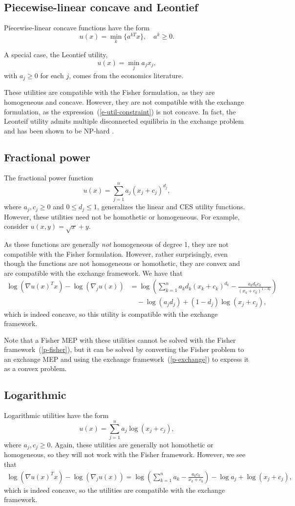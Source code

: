 \documentclass[12pt]{article}
\begin{document}
\subsection{Piecewise-linear concave and Leontief}
Piecewise-linear concave functions have the form
\[
u(x) = \min_k\lbrace a^{kT}x \rbrace,\quad a^k \geq 0.
\]

A special case, the Leontief utility,
\[
u(x) = \min_j a_j x_j,
\]
with $a_j \geq 0$ for each $j$,  comes from the economics literature. 

These utilities are compatible with the Fisher formulation, as they are
homogeneous and concave. However, they are not compatible with the exchange
formulation, as the expression~(\ref{e-util-constraint}) is not concave. In
fact, the Leonteif utility admits multiple disconnected equilibria in the
exchange problem and has been shown to be NP-hard \cite{codenotti2006leontief}.

\subsection{Fractional power}
The fractional power function
\[
u(x) = \sum_{j=1}^n a_j (x_j+ c_j)^{d_j},
\]
where $a_j, c_j \geq 0$ and $0 \leq d_j \leq 1$,
generalizes the linear and CES utility functions.
However, these utilities need not be homothetic or homogeneous.
For example, consider $u(x,y) = \sqrt{x} + y$.

As these functions are generally \emph{not} homogeneous of degree 1,
they are not compatible with the Fisher formulation.
However, rather surprisingly, even though the
functions are not homogeneous or homothetic, they are
convex and are compatible with the exchange framework.
We have that
\begin{align*}
\log(\nabla u(x)^T x) - \log(\nabla_j u(x))
&= \log\left(\sum_{k=1}^n a_k d_k (x_k+c_k)^{d_k} - \frac{a_k d_k c_k}{(x_k + c_k)^{1-d_k}} \right)\\
&\quad- \log(a_j d_j) + (1-d_j)\log (x_j + c_j),
\end{align*}
which is indeed concave, so this utility is compatible with
the exchange framework.

Note that a Fisher MEP with these utilities cannot be solved with the Fisher
framework~(\ref{p-fisher}), but it can be solved by converting the Fisher
problem to an exchange MEP and using the exchange framework~(\ref{p-exchange})
to express it as a convex problem.


\subsection{Logarithmic}
Logarithmic utilities have the form
\[
u(x) = \sum_{j=1}^n a_j \log(x_j+ c_j),
\]
where $a_j, c_j \geq 0$.
Again, these utilities are generally not homothetic or
homogeneous, so they will not work with the Fisher framework.
However, we see that 
\begin{align*}
\log(\nabla u(x)^T x) - \log(\nabla_j u(x)) =
\log\left(\sum_{k=1}^n a_k - \frac{a_k c_k}{x_k+c_k} \right) - \log a_j + \log (x_j + c_j),
\end{align*}
which is indeed concave, so the utilities are compatible
with the exchange framework.
\end{document}
